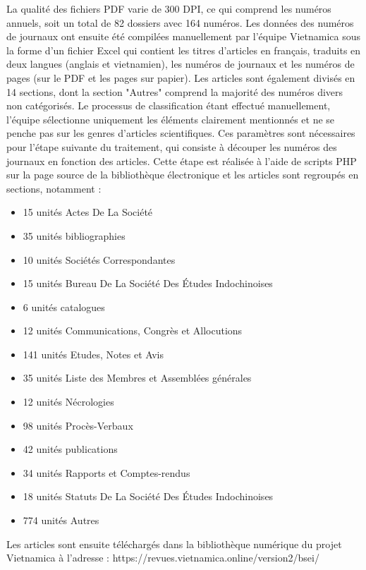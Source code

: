 La qualité des fichiers PDF varie de 300 DPI, ce qui comprend les numéros annuels, soit un total de 82 dossiers avec 164 numéros. Les données des numéros de journaux ont ensuite été compilées manuellement par l'équipe Vietnamica sous la forme d'un fichier Excel qui contient les titres d'articles en français, traduits en deux langues (anglais et vietnamien), les numéros de journaux et les numéros de pages (sur le PDF et les pages sur papier). Les articles sont également divisés en 14 sections, dont la section "Autres" comprend la majorité des numéros divers non catégorisés. Le processus de classification étant effectué manuellement, l'équipe sélectionne uniquement les éléments clairement mentionnés et ne se penche pas sur les genres d'articles scientifiques. Ces paramètres sont nécessaires pour l'étape suivante du traitement, qui consiste à découper les numéros des journaux en fonction des articles. Cette étape est réalisée à l'aide de scripts PHP sur la page source de la bibliothèque électronique et les articles sont regroupés en sections, notamment : 

\begin{itemize}
    \item 15 unités Actes De La Société
    \item 35 unités bibliographies
    \item 10 unités Sociétés Correspondantes
    \item 15 unités Bureau De La Société Des Études Indochinoises
    \item 6 unités catalogues
    \item 12 unités Communications, Congrès et Allocutions
    \item 141 unités Etudes, Notes et Avis
    \item 35 unités Liste des Membres et Assemblées générales
    \item 12 unités Nécrologies
    \item 98 unités Procès-Verbaux
    \item 42 unités publications
    \item 34 unités Rapports et Comptes-rendus
    \item 18 unités Statuts De La Société Des Études Indochinoises
    \item 774 unités Autres
\end{itemize}

Les articles sont ensuite téléchargés dans la bibliothèque numérique du projet Vietnamica à l'adresse : https://revues.vietnamica.online/version2/bsei/

